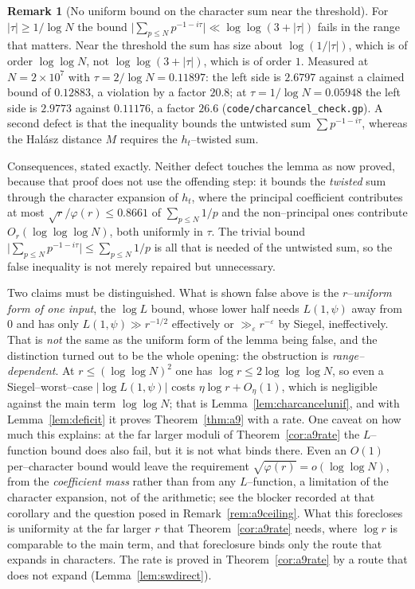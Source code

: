 \documentclass[11pt]{article}
\theoremstyle{definition}
\newtheorem{remark}[theorem]{Remark}
\begin{document}
\begin{remark}[No uniform bound on the character sum near the threshold]\label{rem:charcancelerratum}
For $|\tau|\ge1/\log N$ the bound $\bigl|\sum_{p\le N}p^{-1-i\tau}\bigr|\ll\log\log(3+|\tau|)$ fails in the range that matters. Near the threshold the sum has size about $\log(1/|\tau|)$, which is of order $\log\log N$,
not $\log\log(3+|\tau|)$, which is of order $1$. Measured at $N=2\times10^{7}$ with
$\tau=2/\log N=0.11897$: the left side is $2.6797$ against a claimed bound of $0.12883$, a violation
by a factor $20.8$; at $\tau=1/\log N=0.05948$ the left side is $2.9773$ against $0.11176$, a factor
$26.6$ \textup{(\texttt{code/charcancel\_check.gp})}. A second defect is that the inequality bounds the
untwisted sum $\sum p^{-1-i\tau}$, whereas the Hal\'asz distance $M$ requires the $h_t$--twisted sum.

Consequences, stated exactly. Neither defect touches the lemma as now proved, because that proof
does not use the offending step: it bounds the \emph{twisted} sum through the character expansion of
$h_t$, where the principal coefficient contributes at most $\sqrt r/\varphi(r)\le0.8661$ of
$\sum_{p\le N}1/p$ and the non--principal ones contribute $O_r(\log\log\log N)$, both uniformly in
$\tau$. The
trivial bound $\bigl|\sum_{p\le N}p^{-1-i\tau}\bigr|\le\sum_{p\le N}1/p$ is all that is needed of the
untwisted sum, so the false inequality is not merely repaired but unnecessary.

Two claims must be distinguished. What is shown false
above is the $r$--\emph{uniform form of one input}, the $\log L$ bound, whose lower half needs
$L(1,\psi)$ away from $0$ and has only $L(1,\psi)\gg r^{-1/2}$ effectively or $\gg_\varepsilon
r^{-\varepsilon}$ by Siegel, ineffectively. That is \emph{not} the same as the uniform form of the
lemma being false, and the distinction turned out to be the whole opening: the obstruction is
\emph{range--dependent}. At $r\le(\log\log N)^2$ one has $\log r\le2\log\log\log N$, so even a
Siegel--worst--case $|\log L(1,\psi)|$ costs $\eta\log r+O_\eta(1)$, which is negligible against the
main term $\log\log N$; that is Lemma~\ref{lem:charcancelunif}, and with Lemma~\ref{lem:deficit} it
proves Theorem~\ref{thm:a9} with a rate. One caveat on how much this explains: at the far larger
moduli of Theorem~\ref{cor:a9rate} the $L$--function bound does also fail, but it is not what
binds there. Even an $O(1)$ per--character bound would leave the requirement
$\sqrt{\varphi(r)}=o(\log\log N)$, from the \emph{coefficient mass} rather than from any
$L$--function, a limitation of the character expansion, not of the arithmetic; see the blocker
recorded at that corollary and the question posed in Remark~\ref{rem:a9ceiling}. What this forecloses is uniformity at the far larger $r$ that Theorem~\ref{cor:a9rate} needs, where $\log r$ is comparable
to the main term, and that foreclosure binds only the route that expands in characters. The rate is proved in Theorem~\ref{cor:a9rate} by a route that does not expand \textup{(}Lemma~\ref{lem:swdirect}\textup{)}.
\end{remark}
\end{document}

